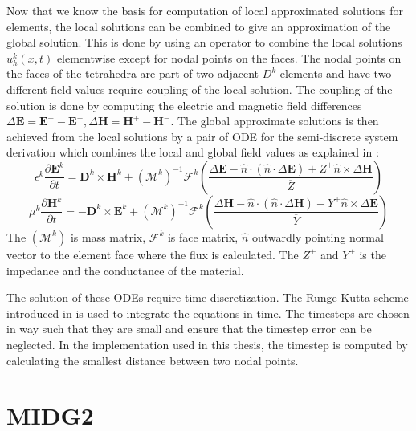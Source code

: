 Now that we know the basis for computation of local approximated solutions for elements,
the local solutions can be combined to give an approximation of the global solution. This is
done by using an operator to combine the local solutions $ u_h^k(x,t) $ elementwise
except for nodal points on the faces. The nodal points
on the faces of the tetrahedra are part of two adjacent $ D^k $ elements and have two different
field values require coupling of the local solution. The coupling of the solution is done
by computing the electric and magnetic field differences \cite{kenter_opencl-based_2018} $\Delta \textbf{E}
= \textbf{E}^+-\textbf{E}^-, \Delta \textbf{H} = \textbf{H}^+ - \textbf{H}^-$.
The global approximate solutions is then achieved from the local solutions \cite{kenter_opencl-based_2018, busch_discontinuous_2011}
by a pair of \ac{ODE} for the semi-discrete system derivation which combines the local and global
field values as explained in \cite{hesthaven_nodal_2008}:
\begin{equation}\label{eqn:pde_e}
\epsilon^k \frac{\partial \textbf{E}^k}{\partial t} = \textbf{D}^k \times \textbf{H}^k
+ (\mathcal{M}^k)^{-1}\mathcal{F}^k \left( \frac{\Delta\textbf{E}-\hat{n} \cdot (\hat{n} \cdot \Delta \textbf{E})+Z^+ \hat{n} \times \Delta \textbf{H} }{\overline{Z}} \right)
\end{equation}
\begin{equation}\label{eqn:pde_h}
    \mu^k \frac{\partial \textbf{H}^k}{\partial t} = - \textbf{D}^k \times \textbf{E}^k
    + (\mathcal{M}^k)^{-1} \mathcal{F}^k \left ( \frac{\Delta \textbf{H} -\hat{n} \cdot (\hat{n} \cdot \Delta \textbf{H})-Y^+ \hat{n} \times \Delta \textbf{E}}{\overline{Y}} \right)
\end{equation}
The $ (\mathcal{M}^k) $ is mass matrix, $\mathcal{F}^k$ is face matrix, $\hat{n}$ outwardly
pointing normal vector to the element face where the flux is calculated. The $ Z^\pm $ and $Y^\pm$ is the impedance and the conductance of the material.

The solution of these \ac{ODE}s require time discretization. The Runge-Kutta
scheme introduced in \cite{shu_total-variation-diminishing_1988} is used
\cite{hesthaven_nodal_2008, kenter_opencl-based_2018} to integrate the
equations in time. The timesteps are chosen in way such that they are small
and ensure that the timestep error can be neglected. In the implementation used
in this thesis, the timestep is computed by calculating the smallest distance between two nodal points.

\section{\acf{MIDG2}}
\label{sec:midg2_base}

